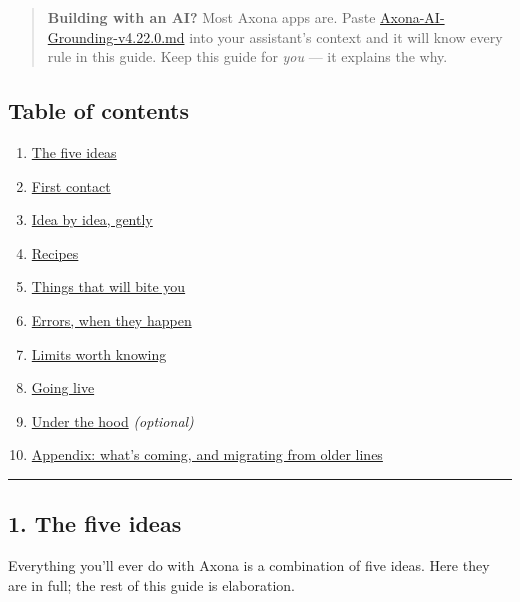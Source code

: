 \documentclass[
  nobib]{tufte-handout}
\providecommand{\tightlist}{%
  \setlength{\itemsep}{0pt}\setlength{\parskip}{0pt}}
\begin{document}
\begin{quote}
\textbf{Building with an AI?} Most Axona apps are. Paste
\url{Axona-AI-Grounding-v4.22.0.md} into your assistant's context and it
will know every rule in this guide. Keep this guide for \emph{you} ---
it explains the why.
\end{quote}

\subsection{Table of contents}\label{table-of-contents}

\begin{enumerate}
\def\labelenumi{\arabic{enumi}.}
\tightlist
\item
  \hyperref[1-the-five-ideas]{The five ideas}
\item
  \hyperref[2-first-contact]{First contact}
\item
  \hyperref[3-idea-by-idea-gently]{Idea by idea, gently}
\item
  \hyperref[4-recipes]{Recipes}
\item
  \hyperref[5-things-that-will-bite-you]{Things that will bite you}
\item
  \hyperref[6-errors-when-they-happen]{Errors, when they happen}
\item
  \hyperref[7-limits-worth-knowing]{Limits worth knowing}
\item
  \hyperref[8-going-live]{Going live}
\item
  \hyperref[9-under-the-hood--optional]{Under the hood}
  \emph{(optional)}
\item
  \hyperref[10-appendix]{Appendix: what's coming, and migrating from
  older lines}
\end{enumerate}

\begin{center}\rule{0.5\linewidth}{0.5pt}\end{center}

\subsection{1. The five ideas}\label{the-five-ideas}

Everything you'll ever do with Axona is a combination of five ideas.
Here they are in full; the rest of this guide is elaboration.
\end{document}
